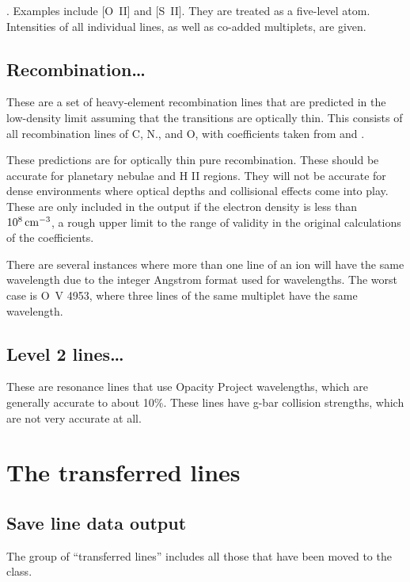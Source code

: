 .  Examples include [O~II] and [S~II].  They are treated as a five-level atom.
Intensities of all individual lines, as well as
co-added multiplets, are given.

\subsection{Recombination\dots}

These are a set of heavy-element recombination lines that are predicted
in the low-density limit assuming that the transitions are optically thin.
This consists of all recombination lines of C, N., and O, with coefficients
taken from \citet{Nussbaumer1984} and \citet{Pequignot1991}.

These predictions are for optically thin pure recombination.
These should
be accurate for planetary nebulae and H II regions.
They will not be
accurate for dense environments where optical depths and collisional effects
come into play.
These are only included in the output if the electron
density is less than $10^8 {\rm\thinspace cm^{-3}}$,
a rough upper limit to the range of validity
in the original calculations of the coefficients.

There are several instances where more than one line of an ion will have
the same wavelength due to the integer Angstrom format used for wavelengths.
The worst case is O~V 4953,
where three lines of the same multiplet have
the same wavelength.

\subsection{Level 2 lines\dots }

These are resonance lines that use Opacity Project wavelengths, which
are generally accurate to about 10\%.
These lines have g-bar collision
strengths, which are not very accurate at all.

\section{The transferred lines}
\label{sec:TransferredLines}

\subsection{Save line data output}

The group of ``transferred lines'' includes all those that have been
moved to the  class.

